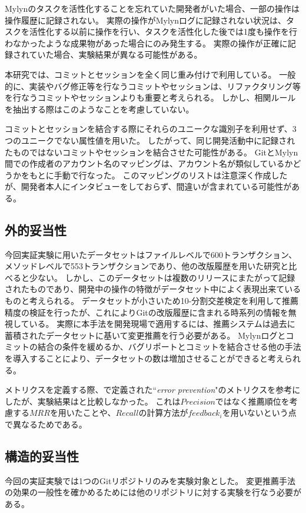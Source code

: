 \documentclass[a4paper]{jsbook}
\begin{document}
Mylynのタスクを活性化することを忘れていた開発者がいた場合、一部の操作は操作履歴に記録されない。
実際の操作がMylynログに記録されない状況は、タスクを活性化する以前に操作を行い、タスクを活性化した後では1度も操作を行わなかったような成果物があった場合にのみ発生する。
実際の操作が正確に記録されていた場合、実験結果が異なる可能性がある。

本研究では、コミットとセッションを全く同じ重み付けで利用している。
一般的に、実装やバグ修正等を行なうコミットやセッションは、リファクタリング等を行なうコミットやセッションよりも重要と考えられる。
しかし、相関ルールを抽出する際はこのようなことを考慮していない。

コミットとセッションを結合する際にそれらのユニークな識別子を利用せず、3つのユニークでない属性値を用いた。
したがって、同じ開発活動中に記録されたものではないコミットやセッションを結合させた可能性がある。
GitとMylyn間での作成者のアカウント名のマッピングは、アカウント名が類似しているかどうかをもとに手動で行なった。
このマッピングのリストは注意深く作成したが、開発者本人にインタビューをしておらず、間違いが含まれている可能性がある。


\subsection{外的妥当性}
今回実証実験に用いたデータセットはファイルレベルで600トランザクション、メソッドレベルで553トランザクションであり、他の改版履歴を用いた研究と比べると少ない。
しかし、このデータセットは複数のリリースにまたがって記録されたものであり、開発中の操作の特徴がデータセット中によく表現出来ているものと考えられる。
データセットが小さいため10-分割交差検定を利用して推薦精度の検証を行ったが、これによりGitの改版履歴に含まれる時系列の情報を無視している。
実際に本手法を開発現場で適用するには、推薦システムは過去に蓄積されたデータセットに基いて変更推薦を行う必要がある。
Mylynログとコミットの結合の条件を緩めるか、バグリポートとコミットを結合させる他の手法を導入することにより、データセットの数は増加させることができると考えられる。

メトリクスを定義する際、\cite{Zimmermann:2005}で定義された``{\it error prevention}"のメトリクスを参考にしたが、実験結果は\cite{Zimmermann:2005}と比較しなかった。
これは$Precision$ではなく推薦順位を考慮する$MRR$を用いたことや、$Recall$の計算方法が$feedback_i$を用いないという点で異なるためである。


\subsection{構造的妥当性}
今回の実証実験では1つのGitリポジトリのみを実験対象とした。
変更推薦手法の効果の一般性を確かめるためには他のリポジトリに対する実験を行なう必要がある。
\end{document}

